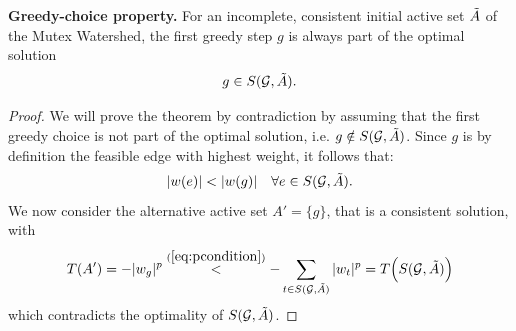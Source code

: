 

\begin{lemma} \label{theo:greedy_choice}
\textbf{Greedy-choice property.}
For an incomplete, consistent initial active set $\tilde{A}$ of the Mutex Watershed, the first greedy step $g$ is always part of the optimal solution $$ g \in S(\mathcal{G},\tilde{A}).$$%
\end{lemma}
\begin{proof}

\noindent We will prove the theorem by contradiction by assuming that the first greedy choice is not part of the optimal solution, i.e. $g \notin S(\mathcal{G},\tilde{A})$. 
Since $g$ is by definition the feasible edge with highest weight, it follows that:
\begin{equation}
|w(e)| < |w(g)| \quad \forall e \in \subproblem(\mathcal{G},\Ainit).%
\end{equation}
\noindent We now consider the alternative active set $A' = \{g\}$, that is a consistent solution, with 
\begin{equation}
T(A') = -|w_g|^p \overset{(\ref{eq:pcondition})}{<} -\sum_{t \in S(\mathcal{G},\tilde{A})} |w_t|^p = T\Big(S(\mathcal{G},\tilde{A})\Big)
\end{equation}
which contradicts the optimality of $S(\mathcal{G},\tilde{A})$.
\end{proof}



